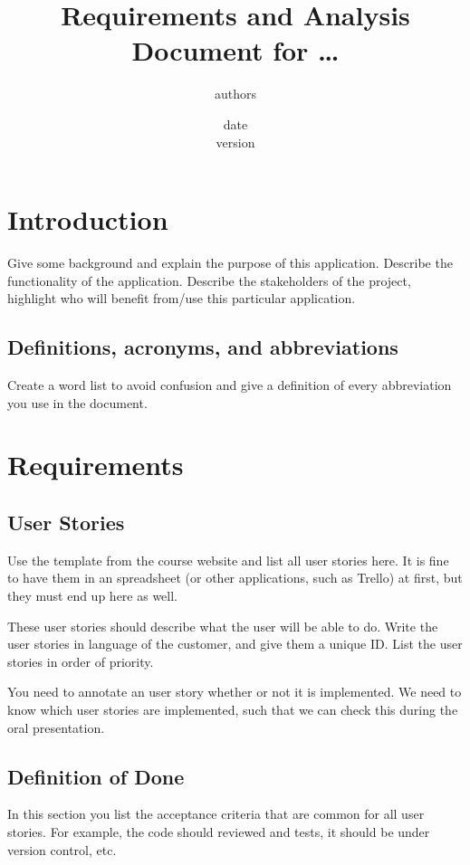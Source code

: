 \documentclass[12pt,a4paper]{scrartcl}
\title{Requirements and Analysis Document for \ldots}
\author{authors}
\date{date\\version}
\begin{document}
\maketitle

\section{Introduction}

Give some background and explain the purpose of this application. Describe 
the functionality of the application. Describe the stakeholders of the project,
highlight who will benefit from/use this particular application.

\subsection{Definitions, acronyms, and abbreviations}

Create a word list to avoid confusion and give a definition of every abbreviation
you use in the document.


\section{Requirements}

\subsection{User Stories}

Use the template from the course website and list all user stories here. It is
fine to have them in an spreadsheet (or other applications, such as Trello) at
first, but they must end up here as well.

These user stories should describe what the user will be able to do. Write 
the user stories in language of the customer, and give them a unique ID. List
the user stories in order of priority. 

You need to annotate an user story whether or not it is implemented. We need to
know which user stories are implemented, such that we can check this during the
oral presentation.

\subsection{Definition of Done}

In this section you list the acceptance criteria that are common for all user
stories. For example, the code should reviewed and tests, it should be under
version control, etc.
\end{document}

